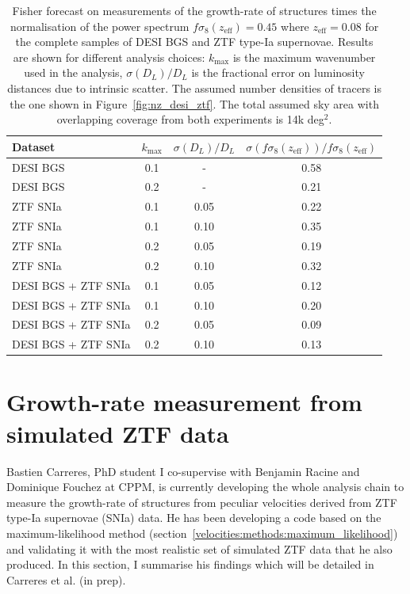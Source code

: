 \begin{table}
    \centering 
    \caption{Fisher forecast on measurements of the growth-rate of structures times the normalisation of the power spectrum 
    $f\sigma_8(z_\text{eff}) = 0.45$ where $z_\text{eff} = 0.08$ for the complete samples of DESI BGS and ZTF type-Ia supernovae. 
    Results are shown for different analysis choices: $k_\text{max}$ is the maximum wavenumber used in the analysis, 
    $\sigma(D_L)/D_L$ is the fractional error on luminosity distances due to intrinsic scatter. 
    The assumed number densities of tracers is the one shown in Figure~\ref{fig:nz_desi_ztf}. 
    The total assumed sky area with overlapping coverage from both experiments is 14k deg$^2$.
    }
    \label{tab:forecast_fs8}
    \begin{tabular}{lccc}
\hline 
\hline 
Dataset   & $k_\text{max}$  &  $\sigma(D_L)/D_L$  &     $\sigma \left(f\sigma_8(z_\text{eff})\right)/f\sigma_8(z_\text{eff})$ \\ 
\hline
DESI BGS  &  0.1 &  - &  0.58 \\
DESI BGS  &  0.2 &  - &  0.21 \\
ZTF SNIa  &  0.1 &  0.05 &  0.22 \\
ZTF SNIa  &  0.1 &  0.10 &  0.35 \\
ZTF SNIa  &  0.2 &  0.05 &  0.19 \\
ZTF SNIa  &  0.2 &  0.10 &  0.32 \\
DESI BGS + ZTF SNIa  &  0.1 &  0.05 &  0.12 \\
DESI BGS + ZTF SNIa  &  0.1 &  0.10 &  0.20 \\
DESI BGS + ZTF SNIa  &  0.2 &  0.05 &  0.09 \\
DESI BGS + ZTF SNIa  &  0.2 &  0.10 &  0.13 \\
\hline
\hline
    \end{tabular}
\end{table}


\section{Growth-rate measurement from simulated ZTF data}
\label{velocities:ztf_fs8}

Bastien Carreres, PhD student I co-supervise with Benjamin Racine and Dominique Fouchez at CPPM, 
is currently developing the whole analysis chain to measure the growth-rate of structures 
from peculiar velocities derived from ZTF type-Ia supernovae (SNIa) data. 
He has been developing a code based on the maximum-likelihood method 
(section~\ref{velocities:methods:maximum_likelihood}) and validating it with 
the most realistic set of simulated ZTF data that he also produced. 
In this section, I summarise his findings which will be detailed in 
Carreres et al. (in prep). 

